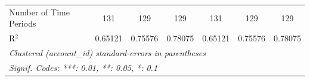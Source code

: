 \begin{table}[htbp]
\begin{threeparttable}[b]
\begin{tabular}{lcccccc}
         Number of Time Periods         & 131             & 129               & 129              & 131             & 129               & 129\\  
         R$^2$                          & 0.65121         & 0.75576           & 0.78075          & 0.65121         & 0.75576           & 0.78075\\  
         \midrule \midrule
         \multicolumn{7}{l}{\emph{Clustered (account\_id) standard-errors in parentheses}}\\
         \multicolumn{7}{l}{\emph{Signif. Codes: ***: 0.01, **: 0.05, *: 0.1}}\\
      \end{tabular}
   \end{threeparttable}
\end{table}


